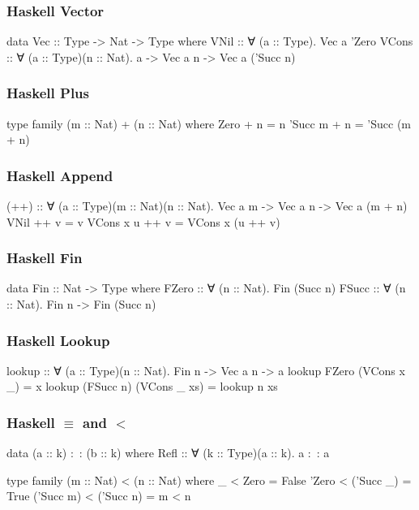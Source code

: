 \documentclass{beamer}
\begin{document}
\begin{frame}[fragile]\frametitle{Haskell Vector}
\begin{semiverbatim}
data Vec :: Type -> Nat -> Type where
  VNil  :: ∀ (a :: Type). Vec a 'Zero
  VCons :: ∀ (a :: Type)(n :: Nat).
    a -> Vec a n -> Vec a ('Succ n)
\end{semiverbatim}
\end{frame}

\begin{frame}[fragile]\frametitle{Haskell Plus}
\begin{semiverbatim}
type family (m :: Nat) + (n :: Nat) where
  Zero    + n = n
  'Succ m + n = 'Succ (m + n)
\end{semiverbatim}
\end{frame}

\begin{frame}[fragile]\frametitle{Haskell Append}
\begin{semiverbatim}
(++) :: ∀ (a :: Type)(m :: Nat)(n :: Nat).
        Vec a m -> Vec a n -> Vec a (m + n)
VNil      ++ v = v
VCons x u ++ v = VCons x (u ++ v)
\end{semiverbatim}
\end{frame}

\begin{frame}[fragile]\frametitle{Haskell Fin}
\begin{semiverbatim}
data Fin :: Nat -> Type where
  FZero :: ∀ (n :: Nat).          Fin (Succ n)
  FSucc :: ∀ (n :: Nat). Fin n -> Fin (Succ n)
\end{semiverbatim}
\end{frame}

\begin{frame}[fragile]\frametitle{Haskell Lookup}
\begin{semiverbatim}
lookup :: ∀ (a :: Type)(n :: Nat). Fin n -> Vec a n -> a
lookup FZero     (VCons x _)  = x
lookup (FSucc n) (VCons _ xs) = lookup n xs
\end{semiverbatim}
\end{frame}

\begin{frame}[fragile]\frametitle{Haskell $\equiv$ and $<$}
\begin{semiverbatim}
data (a :: k) :~: (b :: k) where
  Refl :: ∀ (k :: Type)(a :: k). a :~: a

type family (m :: Nat) < (n :: Nat) where
  _         < Zero      = False
  'Zero     < ('Succ _) = True
  ('Succ m) < ('Succ n) = m < n
\end{semiverbatim}
\end{frame}
\end{document}
